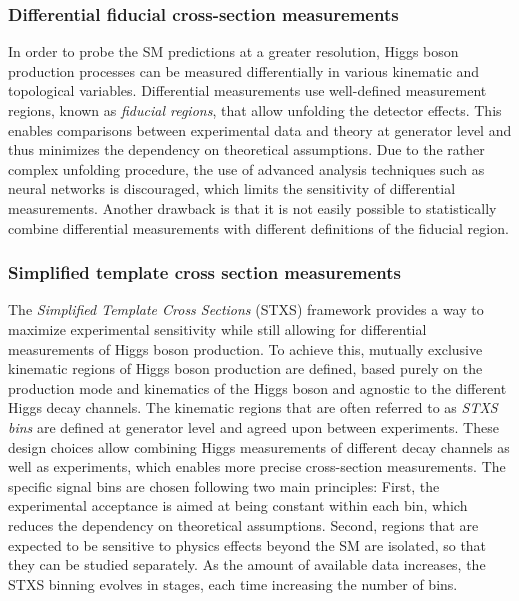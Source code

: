 \subsubsection{Differential fiducial cross-section measurements}
In order to probe the SM predictions at a greater resolution, Higgs boson production processes can be measured differentially in various kinematic and topological variables.
Differential measurements use well-defined measurement regions, known as \emph{fiducial regions}, that allow unfolding the detector effects. 
This enables comparisons between experimental data and theory at generator level and thus minimizes the dependency on theoretical assumptions. 
Due to the rather complex unfolding procedure, the use of advanced analysis techniques such as neural networks is discouraged, which limits the sensitivity of differential measurements.
Another drawback is that it is not easily possible to statistically combine differential measurements with different definitions of the fiducial region.  


\subsubsection{Simplified template cross section measurements}
The \emph{Simplified Template Cross Sections} (STXS) framework provides a way to maximize experimental sensitivity while still allowing for differential measurements of Higgs boson production.
To achieve this, mutually exclusive kinematic regions of Higgs boson production are defined, based purely on the production mode and kinematics of the Higgs boson and agnostic to the different Higgs decay channels. The kinematic regions that are often referred to as \emph{STXS bins} are defined at generator level and agreed upon between experiments.
These design choices allow combining Higgs measurements of different decay channels as well as experiments, which enables more precise cross-section measurements.
The specific signal bins are chosen following two main principles: First, the experimental acceptance is aimed at being constant within each bin, which reduces the dependency on theoretical assumptions. Second, regions that are expected to be sensitive to physics effects beyond the SM are isolated, so that they can be studied separately.
As the amount of available data increases, the STXS binning evolves in stages, each time increasing the number of bins. 

